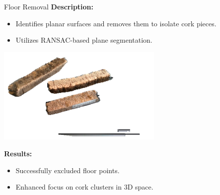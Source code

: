 \documentclass[10pt]{beamer}
\begin{document}
	\begin{frame}{Floor Removal}
		\textbf{Description:}
		\begin{itemize}
			\item Identifies planar surfaces and removes them to isolate cork pieces.
			\item Utilizes RANSAC-based plane segmentation.
		\end{itemize}
			\begin{center} %
				\includegraphics[width=0.6\textwidth]{img/background.png}
			\end{center}
			
		\textbf{Results:}
		\begin{itemize}
			\item Successfully excluded floor points.
			\item Enhanced focus on cork clusters in 3D space.
		\end{itemize}
		
	\end{frame}
	
\end{document}
